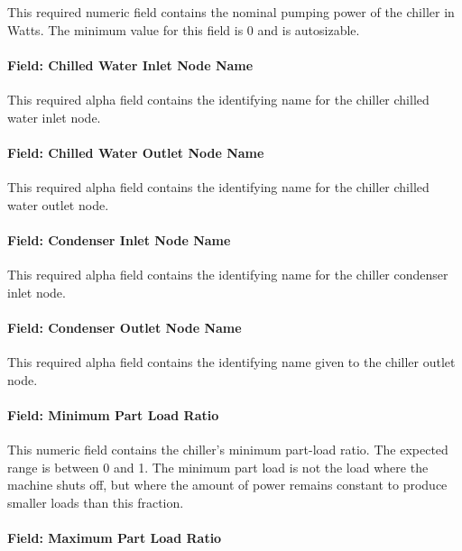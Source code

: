 This required numeric field contains the nominal pumping power of the chiller in Watts. The minimum value for this field is 0 and is autosizable.

\paragraph{Field: Chilled Water Inlet Node Name}\label{field-chilled-water-inlet-node-name-1-000}

This required alpha field contains the identifying name for the chiller chilled water inlet node.

\paragraph{Field: Chilled Water Outlet Node Name}\label{field-chilled-water-outlet-node-name-1-000}

This required alpha field contains the identifying name for the chiller chilled water outlet node.

\paragraph{Field: Condenser Inlet Node Name}\label{field-condenser-inlet-node-name-1}

This required alpha field contains the identifying name for the chiller condenser inlet node.

\paragraph{Field: Condenser Outlet Node Name}\label{field-condenser-outlet-node-name-1}

This required alpha field contains the identifying name given to the chiller outlet node.

\paragraph{Field: Minimum Part Load Ratio}\label{field-minimum-part-load-ratio-1-001}

This numeric field contains the chiller's minimum part-load ratio. The expected range is between 0 and 1. The minimum part load is not the load where the machine shuts off, but where the amount of power remains constant to produce smaller loads than this fraction.

\paragraph{Field: Maximum Part Load Ratio}\label{field-maximum-part-load-ratio-1-001}

